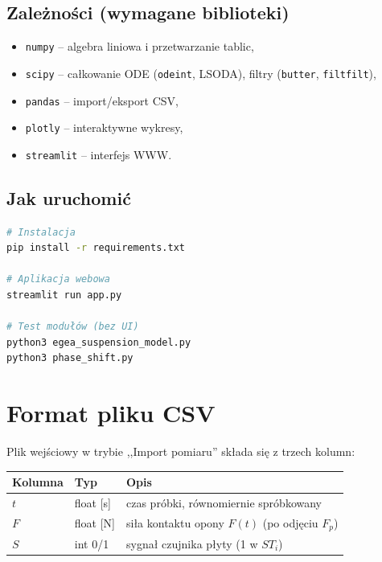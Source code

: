 \documentclass[11pt,a4paper]{article}
\theoremstyle{plainpol}
\begin{document}
\subsection{Zależności (wymagane biblioteki)}

\begin{itemize}
  \item \texttt{numpy} -- algebra liniowa i przetwarzanie tablic,
  \item \texttt{scipy} -- całkowanie ODE (\texttt{odeint}, LSODA),
    filtry (\texttt{butter}, \texttt{filtfilt}),
  \item \texttt{pandas} -- import/eksport CSV,
  \item \texttt{plotly} -- interaktywne wykresy,
  \item \texttt{streamlit} -- interfejs WWW.
\end{itemize}

\subsection{Jak uruchomić}

\begin{lstlisting}[style=py, language=bash, caption={Skrypty uruchomieniowe.}]
# Instalacja
pip install -r requirements.txt

# Aplikacja webowa
streamlit run app.py

# Test modułów (bez UI)
python3 egea_suspension_model.py
python3 phase_shift.py
\end{lstlisting}

\section{Format pliku CSV}

Plik wejściowy w trybie ,,Import pomiaru'' składa się z trzech kolumn:
\begin{center}
\begin{tabular}{lll}
\toprule
\textbf{Kolumna} & \textbf{Typ} & \textbf{Opis} \\
\midrule
$t$ & float [s] & czas próbki, równomiernie spróbkowany \\
$F$ & float [N] & siła kontaktu opony $F(t)$ (po odjęciu $F_p$) \\
$S$ & int 0/1   & sygnał czujnika płyty (1 w $ST_i$) \\
\bottomrule
\end{tabular}
\end{center}
\end{document}
